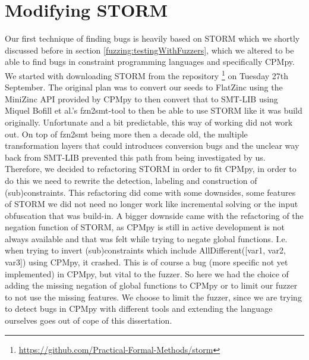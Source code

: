 \section{Modifying STORM}
\label{impl:modifyingSTROM}
Our first technique of finding bugs is heavily based on STORM which we shortly discussed before in section \ref{fuzzing:testingWithFuzzers}, which we altered to be able to find bugs in constraint programming languages and specifically CPMpy. We started with downloading STORM from the repository \footnote{\url{https://github.com/Practical-Formal-Methods/storm}} on Tuesday 27th September.
The original plan was to convert our seeds to FlatZinc using the MiniZinc API provided by CPMpy to then convert that to SMT-LIB \cite{72bofill2010system} using Miquel Bofill et al.'s fzn2smt-tool to then be able to use STORM like it was build originally. Unfortunate and a bit predictable, this way of working did not work out. On top of fzn2smt being more then a decade old, the multiple transformation layers that could introduces conversion bugs and the unclear way back from SMT-LIB prevented this path from being investigated by us.
Therefore, we decided to refactoring STORM in order to fit CPMpy, in order to do this we need to rewrite the detection, labeling and construction of (sub)constraints. This refactoring did come with some downsides, some features of STORM we did not need no longer work like incremental solving or the input obfuscation that was build-in. A bigger downside came with the refactoring of the negation function of STORM, as CPMpy is still in active development is not always available and that was felt while trying to negate global functions. I.e. when trying to invert (sub)constraints which include AllDifferent([var1, var2, var3]) using CPMpy, it crashed. This is of course a bug (more specific not yet implemented) in CPMpy, but vital to the fuzzer. So here we had the choice of adding the missing negation of global functions to CPMpy or to limit our fuzzer to not use the missing features. We choose to limit the fuzzer, since we are trying to detect bugs in CPMpy with different tools and extending the language ourselves goes out of cope of this dissertation. 



